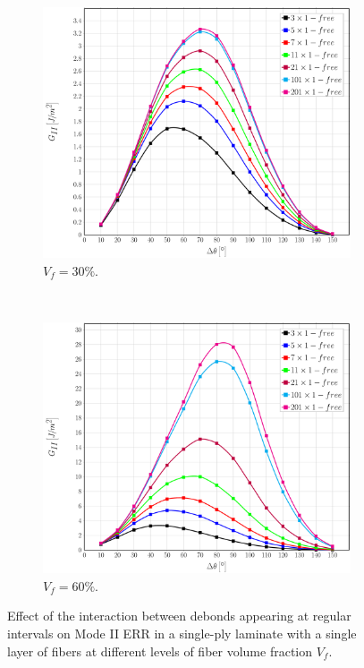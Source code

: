 \documentclass[review]{elsarticle}
\begin{document}
\begin{figure}[!h]
\centering
    \begin{subfigure}[b]{0.475\textwidth}
        \includegraphics[width=\textwidth]{sidefibers-vf30-GII.pdf}
        \caption{$V_{f}=30\%$.}\label{subfig:sidefiber30MII}
    \end{subfigure} ~
    \begin{subfigure}[b]{0.475\textwidth}
        \includegraphics[width=\textwidth]{sidefibers-vf60-GII.pdf}
        \caption{$V_{f}=60\%$.}\label{subfig:sidefiber60MII}
    \end{subfigure}

\caption{Effect of the interaction between debonds appearing at regular intervals on Mode II ERR in a single-ply laminate with a single layer of fibers at different levels of fiber volume fraction $V_{f}$.}\label{fig:sidefibersMII}
\end{figure}
\end{document}
